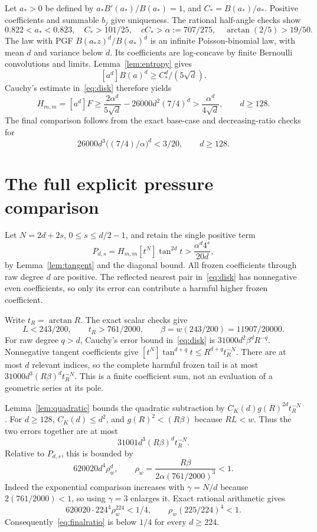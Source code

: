 \documentclass[11pt,a4paper]{article}
\theoremstyle{remark}\newtheorem*{ednote}{Editorial note (ProveIt, 2026-10-01)}
\begin{document}
Let $a_*>0$ be defined by $a_*B'(a_*)/B(a_*)=1$, and $C_*=B(a_*)/a_*$. Positive coefficients and summable $b_j$ give uniqueness. The rational half-angle checks show
\begin{equation}\label{eq:constants}
 0.822<a_*<0.823,\quad C_*>101/25,\quad
 cC_*>\alpha:=707/275,\quad \arctan(2/5)>19/50.
\end{equation}
The law with PGF $B(a_*z)^d/B(a_*)^d$ is an infinite Poisson-binomial law, with mean $d$ and variance below $d$. Its coefficients are log-concave by finite Bernoulli convolutions and limits. Lemma~\ref{lem:entropy} gives
\[
 [a^d]B(a)^d\ge C_*^d/(5\sqrt d).
\]
Cauchy's estimate in~\eqref{eq:disk} therefore yields
\[
 H_{m,m}=[a^d]F\ge\frac{2\alpha^d}{5\sqrt d}
                   -26000d^2(7/4)^d
 >\frac{\alpha^d}{4\sqrt d},\qquad d\ge128.
\]
The final comparison follows from the exact base-case and decreasing-ratio checks for
\[
 26000d^3\bigl((7/4)/\alpha\bigr)^d<3/20,\qquad d\ge128.
\]

\smallskip
\section{The full explicit pressure comparison}
Let $N=2d+2s$, $0\le s\le d/2-1$, and retain the single positive term
\[
 P_{d,s}=H_{m,m}[t^N]\tan^{2d}t
        >\frac{\alpha^d4^s}{20d},
\]
by Lemma~\ref{lem:tangent} and the diagonal bound. All frozen coefficients through raw degree $d$ are positive. The reflected nearest pair in~\eqref{eq:disk} has nonnegative even coefficients, so only its error can contribute a harmful higher frozen coefficient.

Write $t_R=\arctan R$. The exact scalar checks give
\[
 L<243/200,\qquad t_R>761/2000,\qquad
 \beta=w(243/200)=11907/20000.
\]
For raw degree $q>d$, Cauchy's error bound in~\eqref{eq:disk} is
$31000d^2\beta^dR^{-q}$. Nonnegative tangent coefficients give
$[t^N]\tan^{d+q}t\le R^{d+q}t_R^{-N}$. There are at most $d$ relevant indices, so the complete harmful frozen tail is at most
$31000d^3(R\beta)^d t_R^{-N}$. This is a finite coefficient sum, not an evaluation of a geometric series at its pole.

Lemma~\ref{lem:quadratic} bounds the quadratic subtraction by
$C_K(d)g(R)^{2d}t_R^{-N}$. For $d\ge128$, $C_K(d)\le d^2$, and
$g(R)^2<(R\beta)$ because $RL<w$. Thus the two errors together are at most
\begin{equation}\label{eq:errors}
 31001d^3(R\beta)^d t_R^{-N}.
\end{equation}
Relative to $P_{d,s}$, this is bounded by
\begin{equation}\label{eq:finalratio}
 620020d^4\rho_w^d,\qquad
 \rho_w=\frac{R\beta}{2\alpha(761/2000)^3}<1.
\end{equation}
Indeed the exponential comparison increases with $\gamma=N/d$ because $2(761/2000)<1$, so using $\gamma=3$ enlarges it. Exact rational arithmetic gives
\[
 620020\cdot224^4\rho_w^{224}<1/4,\qquad
 \rho_w(225/224)^4<1.
\]
Consequently~\eqref{eq:finalratio} is below $1/4$ for every $d\ge224$.
\end{document}
